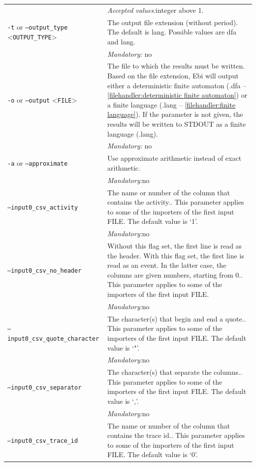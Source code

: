 {\begin{tabularx}{\linewidth}{lX}
&\textit{Accepted values:}\quad integer above 1.\\
\texttt{-t} or \texttt{--output\_type} <\texttt{OUTPUT\_TYPE}> &
The output file extension (without period). The default is lang. Possible values are dfa and lang.\\
&\textit{Mandatory:} \quad no\\
\texttt{-o} or \texttt{--output} <\texttt{FILE}> &
The file to which the results must be written. Based on the file extension, Ebi will output either a deterministic finite automaton (.dfa -- \cref{filehandler:deterministic finite automaton}) or a finite language (.lang -- \cref{filehandler:finite language}).
If the parameter is not given, the results will be written to STDOUT as a finite language (.lang).\\
&\textit{Mandatory:} \quad no\\
\texttt{-a} or \texttt{--approximate} & Use approximate arithmetic instead of exact arithmetic.\\
&\textit{Mandatory:}\quad no\\
\texttt{--input0\_csv\_activity} & The name or number of the column that contains the activity.. This parameter applies to some of the importers of the first input FILE. The default value is `1'.\\
&\textit{Mandatory:}\quad no\\
\texttt{--input0\_csv\_no\_header} & Without this flag set, the first line is read as the header. 
    With this flag set, the first line is read as an event. In the latter case, the columns are given numbers, starting from 0.. This parameter applies to some of the importers of the first input FILE. \\
&\textit{Mandatory:}\quad no\\
\texttt{--input0\_csv\_quote\_character} & The character(s) that begin and end a quote.. This parameter applies to some of the importers of the first input FILE. The default value is `"'.\\
&\textit{Mandatory:}\quad no\\
\texttt{--input0\_csv\_separator} & The character(s) that separate the columns.. This parameter applies to some of the importers of the first input FILE. The default value is `,'.\\
&\textit{Mandatory:}\quad no\\
\texttt{--input0\_csv\_trace\_id} & The name or number of the column that contains the trace id.. This parameter applies to some of the importers of the first input FILE. The default value is `0'.\\

\end{tabularx}}
